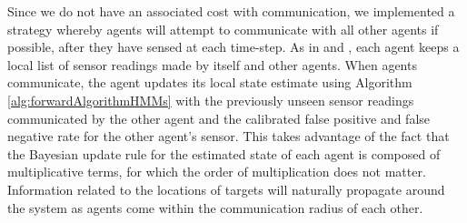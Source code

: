 Since we do not have an associated cost with communication, we implemented a strategy whereby agents will attempt to communicate with all other agents if possible, after they have sensed at each time-step. As in \cite{Chung2008Multi-agentFramework} and \cite{Waharte2009CoordinatedUAVs}, each agent keeps a local list of sensor readings made by itself and other agents. When agents communicate, the agent updates its local state estimate using Algorithm \ref{alg:forwardAlgorithmHMMs} with the previously unseen sensor readings communicated by the other agent and the calibrated false positive and false negative rate for the other agent's sensor. This takes advantage of the fact that the Bayesian update rule for the estimated state of each agent is composed of multiplicative terms, for which the order of multiplication does not matter. Information related to the locations of targets will naturally propagate around the system as agents come within the communication radius of each other. %